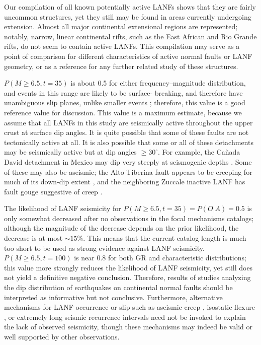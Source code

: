 \documentclass[twocolumn,grl]{AGUTeX}
\begin{document}
\begin{article}
Our compilation of all known potentially active LANFs shows that they are
fairly uncommon structures, yet they still may be found in areas currently
undergoing extension. Almost all major continental extensional regions are
represented; notably, narrow, linear continental rifts, such as the East
African and Rio Grande rifts, do not seem to contain active LANFs.  This
compilation may serve as a point of comparison for different characteristics of
active normal faults or LANF geometry, or as a reference for any further
related study of these structures.

$P(M\ge6.5, t=35)$ is about 0.5 for either frequency--magnitude distribution,
and events in this range are likely to be surface- breaking, and therefore have
unambiguous slip planes, unlike smaller events \citep{hecker2013eqdist};
therefore, this value is a good reference value for discussion.  This value is
a maximum estimate, because we assume that all LANFs in this study are
seismically active throughout the upper crust at surface dip angles.  It is
quite possible that some of these faults are not tectonically active at all. It
is also possible that some or all of these detachments may be seismically
active but at dip angles $\ge30^\circ$.  For example, the Ca\~nada David
detachment in Mexico may dip very steeply at seismogenic depths
\citep{fletcherspelz2009}.  Some of these may also be aseismic; the
Alto-Tiberina fault appears to be creeping for much of its down-dip extent
\citep{hreinsdottir2009altotib}, and the neighboring Zuccale inactive LANF has
fault gouge suggestive of creep  \citep{collettiniholdsworth2004}.

The likelihood of LANF seismicity for $P(M\ge6.5, t=35) = P(O|A) = 0.5 $ is
only somewhat decreased after no observations in the focal mechanisms catalogs;
although the magnitude of the decrease depends on the prior likelihood, the
decrease is at most $\sim 15 \%$. This means that the current catalog length is
much too short to be used as strong evidence against LANF seismicity.
$P(M\ge6.5, t=100)$ is near 0.8 for both GR and characteristic distributions;
this value more strongly reduces the likelihood of LANF seismicity, yet still
does not yield a definitive negative conclusion.  Therefore, results of studies
analyzing the dip distribution of earthquakes on continental normal faults
\citep{jackson1987, collettinisibson2001} should be interpreted as informative
but not conclusive. Furthermore, alternative mechanisms for LANF occurrence or
slip such as aseismic creep \citep [e.g.,][]{collettini2011lanfmech,
hreinsdottir2009altotib}, isostatic flexure \citep[e.g.,][]
{wernickeaxen1988rolling}, or extremely long seismic recurrence intervals
\citep{wernicke1995seis} need not be invoked to explain the lack of observed
seismicity, though these mechanisms may indeed be valid or well supported by
other observations.



\end{article}
\end{document}
